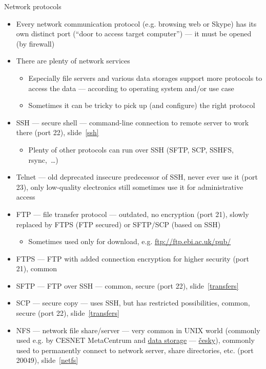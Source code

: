 \documentclass[compress, ucs, xelatex, 11pt, xcolor=svgnames, aspectratio=169,
	hyperref={
		bookmarks=true,
		unicode=true,
		colorlinks=true,
		pdftitle={Linux, command line and MetaCentrum},
		plainpages=false,
		pdfauthor={Vojtech Zeisek},
		pdfsubject={Course about use of Linux command line, writing shell scripts and using MetaCentrum of CESNET},
		pdfcreator={XeLaTeX},
		pdfkeywords={Linux, GNU, BASH, shell, command line, MetaCentrum},
		linkcolor=DarkRed, %
		anchorcolor=DarkBlue, %
		citecolor=Indigo, %
		filecolor=NavyBlue, %
		menucolor=DarkMagenta, %
		urlcolor=DarkBlue, %
		pdftex},
	url={hyphens, lowtilde} %
	]{beamer}
\begin{document}
\begin{frame}[allowframebreaks]{Network protocols}
	\begin{itemize}
		\item Every network communication protocol (e.g. browsing web or Skype) has its own distinct port (\enquote{door to access target computer}) --- it must be opened (by firewall)
		\item There are plenty of network services
		\begin{itemize}
			\item Especially file servers and various data storages support more protocols to access the data --- according to operating system and/or use case
			\item Sometimes it can be tricky to pick up (and configure) the right protocol
		\end{itemize}
		\item SSH --- secure shell --- command-line connection to remote server to work there (port 22), slide~\ref{ssh}
		\begin{itemize}
			\item Plenty of other protocols can run over SSH (SFTP, SCP, SSHFS, rsync,~\ldots)
		\end{itemize}
		\item Telnet --- old deprecated insecure predecessor of SSH, never ever use it (port 23), only low-quality electronics still sometimes use it for administrative access
		\item FTP --- file transfer protocol --- outdated, no encryption (port 21), slowly replaced by FTPS (FTP secured) or SFTP/SCP (based on SSH)
		\begin{itemize}
			\item Sometimes used only for download, e.g. \url{ftp://ftp.ebi.ac.uk/pub/}
		\end{itemize}
		\item FTPS --- FTP with added connection encryption for higher security (port 21), common
		\item SFTP --- FTP over SSH --- common, secure (port 22), slide~\ref{transfers}
		\item SCP --- secure copy --- uses SSH, but has restricted possibilities, common, secure (port 22), slide~\ref{transfers}
		\item NFS --- network file share/server --- very common in UNIX world (commonly used e.g. by CESNET MetaCentrum and \href{https://du.cesnet.cz/en/navody/nfs/start}{data storage} --- \href{https://du.cesnet.cz/cs/navody/nfs/start}{česky}), commonly used to permanently connect to network server, share directories, etc. (port 20049), slide~\ref{netfs}

\end{itemize}
\end{frame}
\end{document}
